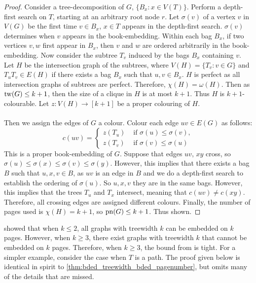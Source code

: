 \begin{proof}
	Consider a tree-decomposition of \(G\), $\{B_x: x \in V(T)\}$. Perform a depth-first search on \(T\), starting at an arbitrary root node \(r\). Let \(\sigma(v)\) of a vertex \(v\) in \(V(G)\) be the first time \(v \in B_x\), $x \in T$ appears in the depth-first search. $\sigma(v)$ determines when $v$ appears in the book-embedding. Within each bag $B_x$, if two vertices $v,w$ first appear in $B_x$, then $v$ and $w$ are ordered arbitrarily in the book-embedding. Now consider the subtree \(T_v\) induced by the bags \(B_x\) containing \(v\). Let \(H\) be the intersection graph of the subtrees, where \(V(H) = \lbrace T_v : v \in G \rbrace\) and \(T_u T_v \in E(H)\) if there exists a bag \(B_x\) such that \(u, v \in B_x\). \(H\) is perfect as all intersection graphs of subtrees are perfect. Therefore, \(\chi(H) = \omega(H)\). Then as \(\operatorname{tw}(G) \leq k + 1\), then the size of a clique in \(H\) is at most \(k + 1\). Thus \(H\) is \(k + 1\)-colourable. Let $z: V(H) \rightarrow [k + 1]$ be a proper colouring of $H$. 
	\paragraph{}
	Then we assign the edges of \(G\) a colour. Colour each edge \(uv \in E(G)\) as follows:
	\begin{equation}
		c(uv) =
		\begin{cases}
			z(T_u) & \text{ if } \sigma(u) \leq \sigma(v), \\
			z(T_v) & \text{ if } \sigma(v) \leq \sigma(u)
		\end{cases}
	\end{equation}
	This is a proper book-embedding of \(G\). Suppose that edges \(uv\), \(xy\) cross, so \(\sigma(u) \leq \sigma(x) \leq \sigma(v) \leq \sigma(y)\). However, this implies that there exists a bag \(B\) such that \(u, x, v \in B\), as \(uv\) is an edge in \(B\) and we do a depth-first search to establish the ordering of $\sigma(u)$. So \(u, x, v\) they are in the same bags. However, this implies that the trees \(T_u\) and \(T_x\) intersect, meaning that \(c(uv) \neq c(xy)\). Therefore, all crossing edges are assigned different colours. Finally, the number of pages used is \(\chi(H) = k + 1\), so \(\operatorname{pn}(G) \leq k + 1\). Thus shown.
\end{proof}
\textcite{dujmovicGraphTreewidthGeometric2007} showed that when $k \leq 2$, all graphs with treewidth $k$ can be embedded on $k$ pages. However, when $k \geq 3$, there exist graphs with treewidth $k$ that cannot be embedded on $k$ pages. Therefore, when $k \geq 3$, the bound from \textcite{ganleyPagenumberTrees2001} is tight. 
For a simpler example, consider the case when $T$ is a path. The proof given below is identical in spirit to \cref{thm:bded_treewidth_bded_pagenumber}, but omits many of the details that are missed. 

